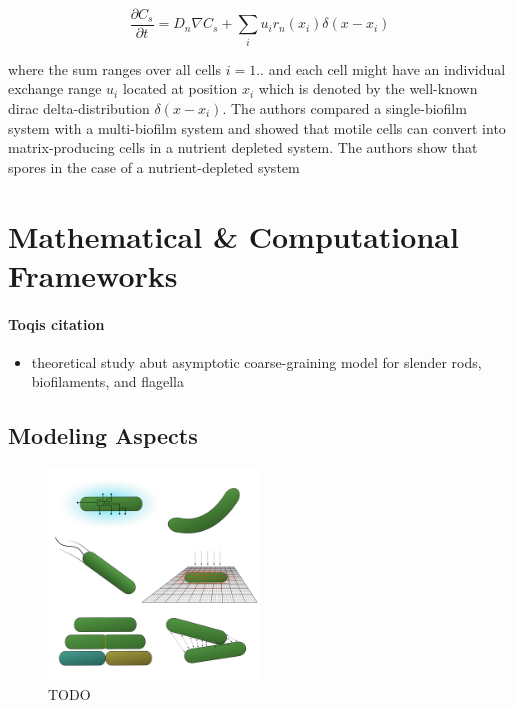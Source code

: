 \documentclass{article}
\begin{document}
\begin{equation}
    \frac{\partial C_s}{\partial t} = D_n \nabla C_s  + \sum\limits_i u_i r_n (x_i) \delta(x-x_i)
\end{equation}

where the sum ranges over all cells $i=1..$ and each cell might have an individual exchange range $u_i$ located at position $x_i$ which is denoted by the well-known dirac delta-distribution $\delta(x-x_i)$.
The authors compared a single-biofilm system with a multi-biofilm system and showed that motile cells can convert into matrix-producing cells in a nutrient depleted system.
The authors show that spores in the case of a nutrient-depleted system

\section{Mathematical \& Computational Frameworks}
\paragraph{Toqis citation}
\begin{itemize}
\item \cite{Moreau2018} theoretical study abut asymptotic coarse-graining model for slender rods, biofilaments, and flagella
\end{itemize}


\subsection{Modeling Aspects}

\begin{figure}
    \centering
    \includegraphics[width=0.5\textwidth]{figures/concept-figure.png}
    \caption{TODO}
    \label{fig:concept-figure-aspects}
\end{figure}
\end{document}
